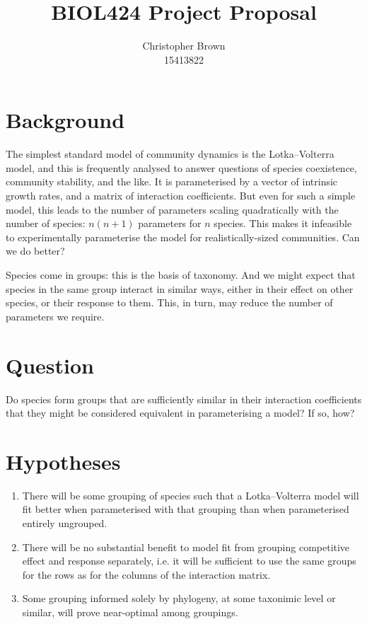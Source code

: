 \documentclass[a4paper,11pt]{article}
\title{BIOL424 Project Proposal}
\author{
	Christopher Brown\\15413822
}
\date{}
\begin{document}
\maketitle

\section{Background}

The simplest standard model of community dynamics is the Lotka--Volterra model, and this is frequently analysed to answer questions of species coexistence, community stability, and the like.
It is parameterised by a vector of intrinsic growth rates, and a matrix of interaction coefficients.
But even for such a simple model, this leads to the number of parameters scaling quadratically with the number of species: $n(n+1)$ parameters for $n$ species.
This makes it infeasible to experimentally parameterise the model for realistically-sized communities.
Can we do better?

Species come in groups: this is the basis of taxonomy.
And we might expect that species in the same group interact in similar ways, either in their effect on other species, or their response to them.
This, in turn, may reduce the number of parameters we require.

\section{Question}

Do species form groups that are sufficiently similar in their interaction coefficients that they might be considered equivalent in parameterising a model?
If so, how?

\section{Hypotheses}

\begin{enumerate}
	\item There will be some grouping of species such that a Lotka--Volterra model will fit better when parameterised with that grouping than when parameterised entirely ungrouped.
	\item There will be no substantial benefit to model fit from grouping competitive effect and response separately, i.e. it will be sufficient to use the same groups for the rows as for the columns of the interaction matrix.
	\item Some grouping informed solely by phylogeny, at some taxonimic level or similar, will prove near-optimal among groupings.
\end{enumerate}
\end{document}
